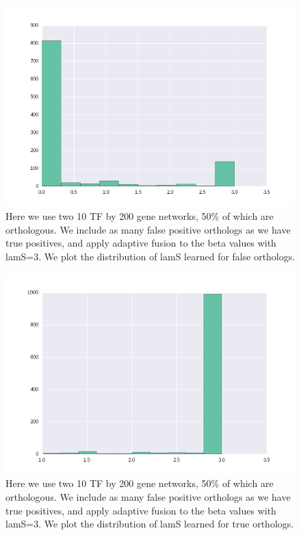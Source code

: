 \documentclass[11pt]{article}
\begin{document}
\begin{figure}
\begin{center}
  \includegraphics[scale=0.45]{scadf.png}
  \caption{\label{fig:figure1} Here we use two 10 TF by 200 gene networks, 50\% of which are orthologous. We include as many false positive orthologs as we have true positives, and apply adaptive fusion to the beta values with lamS=3. We plot the distribution of lamS learned for false orthologs.}
  \end{center}
\end{figure}

\begin{figure}
\begin{center}
  \includegraphics[scale=0.45]{scadt.png}
  \caption{\label{fig:figure1} Here we use two 10 TF by 200 gene networks, 50\% of which are orthologous. We include as many false positive orthologs as we have true positives, and apply adaptive fusion to the beta values with lamS=3. We plot the distribution of lamS learned for true orthologs.}
  \end{center}
\end{figure}
\end{document}
